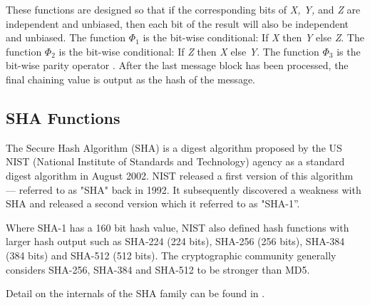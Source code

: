 These functions are designed so that if the corresponding bits of
\emph{X, Y,} and \emph{Z} are independent and unbiased, then each bit of
the result will also be independent and unbiased. The function
\(\Phi_1\) is the bit-wise conditional: If \emph{X} then \emph{Y} else
\emph{Z}. The function \(\Phi_2\) is the bit-wise conditional: If
\emph{Z} then \emph{X} else \emph{Y}. The function \(\Phi_3\) is the
bit-wise parity operator \cite{ref7}. After the last message
block has been processed, the final chaining value is output as the hash
of the message.

\subsection{SHA Functions}\label{sec:3.2}\label{sha-functions}

The Secure Hash Algorithm (SHA) \cite{ref10} is a digest
algorithm proposed by the US NIST (National Institute of Standards and
Technology) agency as a standard digest algorithm in August 2002. NIST
released a first version of this algorithm --- referred to as "SHA" back
in 1992. It subsequently discovered a weakness with SHA and released a
second version which it referred to as "SHA-1''.

Where SHA-1 has a 160 bit hash value, NIST also defined hash functions
with larger hash output such as SHA-224 (224 bits), SHA-256 (256 bits),
SHA-384 (384 bits) and SHA-512 (512 bits). The cryptographic community
generally considers SHA-256, SHA-384 and SHA-512 to be stronger than
MD5.

Detail on the internals of the SHA family can be found in
\cite{ref10}.
